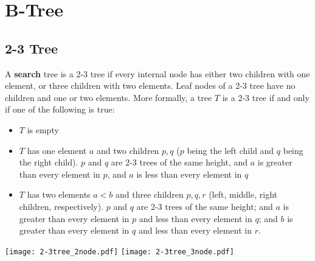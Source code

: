 \section{B-Tree}

\subsection{2-3 Tree}

\vspace{\parskip}

\begin{definition} 
    A \textbf{search} tree is a 2-3 tree if every internal node has either two children with one element, or three children with two elements. Leaf nodes of a 2-3 tree have no children and one or two elements. More formally, a tree $T$  is a 2-3 tree if and only if one of the following is true:
    \begin{itemize}
        \item $T$ is empty
        \item $T$ has one element $a$ and two children $p,q$ ($p$ being the left child and $q$ being the right child). $p$ and $q$ are 2-3 trees of the same height, and $a$ is greater than every element in $p$, and $a$ is less than every element in $q$ 
        \item $T$ has two elements $a < b$ and three children $p,q,r$ (left, middle, right children, respectively). $p$ and $q$ are 2-3 trees of the same height; and $a$ is greater than every element in $p$ and less than every element in $q$; and $b$ is greater than every element in $q$ and less than every element in $r$.
    \end{itemize}
    \begin{center}
        \texttt{[image: 2-3tree\_2node.pdf]} \texttt{[image: 2-3tree\_3node.pdf]}
    \end{center}
\end{definition}
